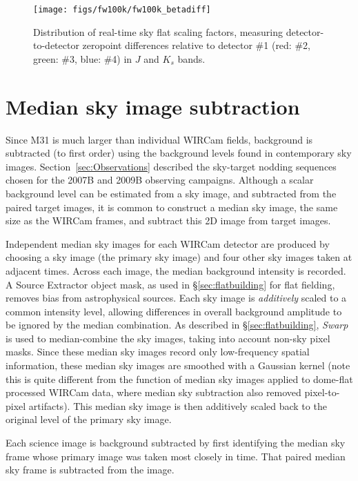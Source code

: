 \documentclass[iop]{emulateapj}
\newcommand{\sw}[1]{\textit{#1}} %
\newcommand{\Sec}[1]{\S\ref{sec:#1}}  %
\begin{document}
\begin{figure}[t]
\centering
\texttt{[image: figs/fw100k/fw100k\_betadiff]}
\caption{Distribution of real-time sky flat scaling factors, measuring detector-to-detector zeropoint differences relative to detector \#1 (red: \#2, green: \#3, blue: \#4) in $J$ and $K_s$ bands.
}
\label{fig:fw100k_zpdiff}
\end{figure}

\section{Median sky image subtraction}
\label{sec:mediansky}

Since M31 is much larger than individual WIRCam fields, background is subtracted (to first order) using the background levels found in contemporary sky images.
Section~\ref{sec:Observations} described the sky-target nodding sequences chosen for the 2007B and 2009B observing campaigns. 
Although a scalar background level can be estimated from a sky image, and subtracted from the paired target images, it is common to construct a median sky image, the same size as the WIRCam frames, and subtract this 2D image from target images.

Independent median sky images for each WIRCam detector are produced by choosing a sky image (the primary sky image) and four other sky images taken at adjacent times.
Across each image, the median background intensity is recorded.
A Source Extractor object mask, as used in \Sec{flatbuilding} for flat fielding, removes bias from astrophysical sources.
Each sky image is \emph{additively} scaled to a common intensity level, allowing differences in overall background amplitude to be ignored by the median combination.
As described in \Sec{flatbuilding}, \sw{Swarp} is used to median-combine the sky images, taking into account non-sky pixel masks.
Since these median sky images record only low-frequency spatial information, these median sky images are smoothed with a Gaussian kernel (note this is quite different from the function of median sky images applied to dome-flat processed WIRCam data, where median sky subtraction also removed pixel-to-pixel artifacts).
This median sky image is then additively scaled back to the original level of the primary sky image.

Each science image is background subtracted by first identifying the median sky frame whose primary image was taken most closely in time.
That paired median sky frame is subtracted from the image.
\end{document}
